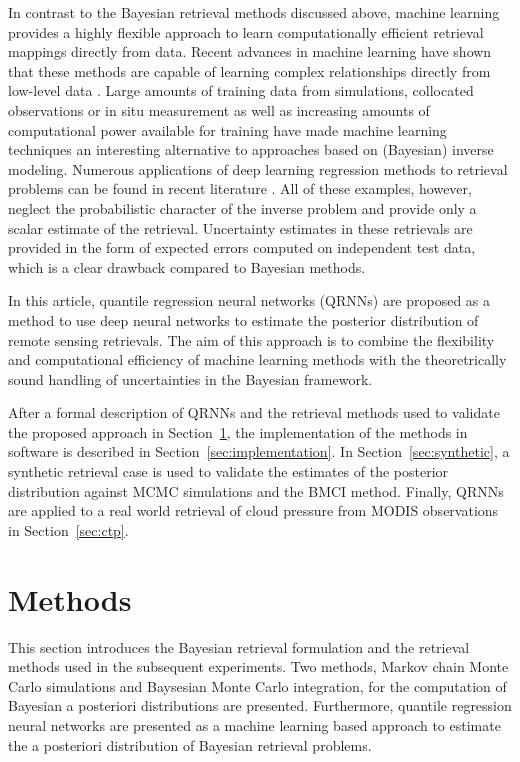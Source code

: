 \documentclass[journal abbreviation, manuscript]{copernicus}
\begin{document}
In contrast to the Bayesian retrieval methods discussed above, machine learning
provides a highly flexible approach to learn computationally efficient retrieval
mappings directly from data. Recent advances in machine learning have shown that
these methods are capable of learning complex relationships directly from
low-level data \citep{lecun}. Large amounts of training data from simulations,
collocated observations or in situ measurement as well as increasing amounts of
computational power available for training have made machine learning techniques
an interesting alternative to approaches based on (Bayesian) inverse modeling.
Numerous applications of deep learning regression methods to retrieval problems
can be found in recent literature \citep{holl, strandgren, hakansson}. All of
these examples, however, neglect the probabilistic character of the inverse
problem and provide only a scalar estimate of the retrieval. Uncertainty
estimates in these retrievals are provided in the form of expected errors
computed on independent test data, which is a clear drawback compared to
Bayesian methods.

In this article, quantile regression neural networks (QRNNs) are proposed as a
method to use deep neural networks to estimate the posterior distribution of
remote sensing retrievals. The aim of this approach is to combine the
flexibility and computational efficiency of machine learning methods with the
theoretrically sound handling of uncertainties in the Bayesian framework. 

After a formal description of QRNNs and the retrieval methods used to validate
the proposed approach in Section~\ref{sec:methods}, the implementation of the
methods in software is described in Section~\ref{sec:implementation}. In
Section~\ref{sec:synthetic}, a synthetic retrieval case is used to validate the
estimates of the posterior distribution against MCMC simulations and the BMCI
method. Finally, QRNNs are applied to a real world retrieval of cloud pressure
from MODIS observations in Section~\ref{sec:ctp}.

\section{Methods}
\label{sec:methods}

This section introduces the Bayesian retrieval formulation and the retrieval methods
used in the subsequent experiments. Two methods, Markov chain Monte Carlo simulations
and Baysesian Monte Carlo integration, for the computation of Bayesian a posteriori
distributions are presented. Furthermore, quantile regression neural networks are
presented as a machine learning based approach to estimate the a posteriori distribution
of Bayesian retrieval problems.
\end{document}

